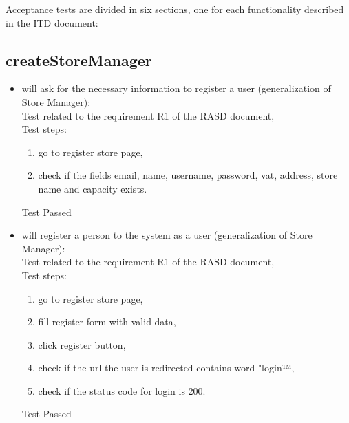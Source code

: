 Acceptance tests are divided in six sections, one for each functionality described in the ITD document:

\subsection{createStoreManager}

\begin{itemize}
    \item will ask for the necessary information to register a user (generalization of Store Manager): \\
    Test related to the requirement R1 of the RASD document, \\
    Test steps:
    \begin{enumerate}
        \item go to register store page,
        \item check if the fields email, name, username, password, vat, address, store name and capacity exists.
    \end{enumerate}
    Test Passed \\

    \item will register a person to the system as a user (generalization of Store Manager): \\
    Test related to the requirement R1 of the RASD document, \\
    Test steps:
    \begin{enumerate}
        \item go to register store page,
        \item fill register form with valid data,
        \item click register button,
        \item check if the url the user is redirected contains word "login™,
        \item check if the status code for login is 200.
    \end{enumerate}
    Test Passed\\


\end{itemize}
